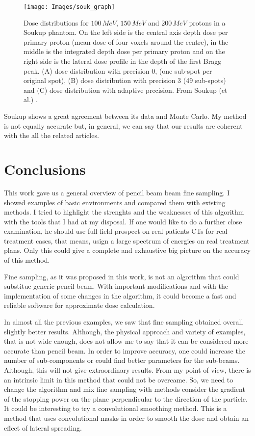 \documentclass[12pt, a4paper, twoside]{book}
\begin{document}
\begin{figure}[!t]
\centering
{\texttt{[image: Images/souk\_graph]}} 
\caption{Dose distributions for $100\,MeV$, $150\,MeV$ and $200\,MeV$ protons in a Soukup phantom. On the left
side is the central axis depth dose per primary proton (mean dose of four voxels around the centre), in the middle is the integrated depth dose per primary proton and on the right side is the lateral dose profile in the depth of the first Bragg peak. (A) dose distribution with precision 0, (one sub-spot per original spot), (B) dose distribution with precision 3 (49 sub-spots) and (C) dose distribution with adaptive precision. From Soukup (et al.) \cite{souk:pba}.}
\label{fig:souk_graph}
\end{figure}


Soukup shows a great agreement between its data and Monte Carlo. My method is not equally accurate but, in general, we can say that our results are coherent with the all the related articles. 



\chapter{Conclusions} %
This work gave us a general overview of pencil beam beam fine sampling. I showed examples of basic environments and compared them with existing methods. I tried to highlight the strenghts and the weaknesses of this algorithm with the tools that I had at my disposal. 
If one would like to do a further close examination, he should use full field prospect on real patients CTs for real treatment cases, that means, usign a large spectrum of energies on real treatment plans. Only this could give a complete and exhaustive big picture on the accuracy of this method.

Fine sampling, as it was proposed in this work, is not an algorithm that could substitue generic pencil beam. With important modifications and with the implementation of some changes in the algorithm, it could become a fast and reliable software for approximate dose calculation.

In almost all the previous examples, we saw that fine sampling obtained overall slightly better results. Although, the physical approach and variety of examples, that is not wide enough, does not allow me to say that it can be considered more accurate than pencil beam. In order to improve accuracy, one could increase the number of sub-components or could find better parameters for the sub-beams. Although, this will not give extraordinary results.
From my point of view, there is an intrinsic limit in this method that could not be overcame. So, we need to change the algorithm and mix fine sampling with methods consider the gradient of the stopping power on the plane perpendicular to the direction of the particle.
It could be interesting to try a convolutional smoothing method. %
This is a method that uses convolutional masks in order to smooth the dose and obtain an effect of lateral spreading.
\end{document}
